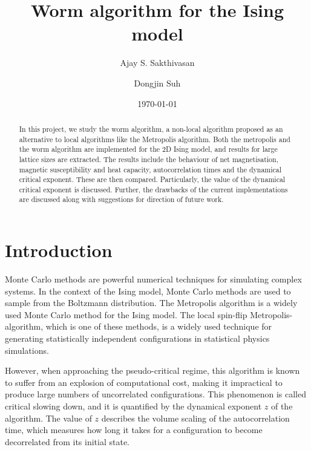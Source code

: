 \documentclass[%
reprint,
 amsmath,amssymb,
 aps,
]{revtex4-2}
\begin{document}
\title{Worm algorithm for the Ising model}%

\author{Ajay S. Sakthivasan}
\author{Dongjin Suh}

\date{\today}%

\begin{abstract}
In this project, we study the worm algorithm, a non-local algorithm proposed as an alternative to local algorithms like the Metropolis algorithm. Both the metropolis and the worm algorithm are implemented for the 2D Ising model, and results for large lattice sizes are extracted. The results include the behaviour of net magnetisation, magnetic susceptibility and heat capacity, autocorrelation times and the dynamical critical exponent. These are then compared. Particularly, the value of the dynamical critical exponent is discussed. Further, the drawbacks of the current implementations are discussed along with suggestions for direction of future work.
\end{abstract}
\maketitle

\tableofcontents

\section{Introduction} 
Monte Carlo methods are powerful numerical techniques for simulating complex systems. In the context of the Ising model, Monte Carlo methods are used to sample from the Boltzmann distribution. The Metropolis algorithm is a widely used Monte Carlo method for the Ising model. The local spin-flip Metropolis-algorithm, which is one of these methods, is a widely used technique for generating statistically independent configurations in statistical physics simulations.

However, when approaching the pseudo-critical regime, this algorithm is known to suffer from an explosion of computational cost, making it impractical to produce large numbers of uncorrelated configurations. This phenomenon is called critical slowing down, and it is quantified by the dynamical exponent $z$ of the algorithm\cite{Adzhemyan_2022}. The value of $z$ describes the volume scaling of the autocorrelation time, which measures how long it takes for a configuration to become decorrelated from its initial state.
\end{document}
